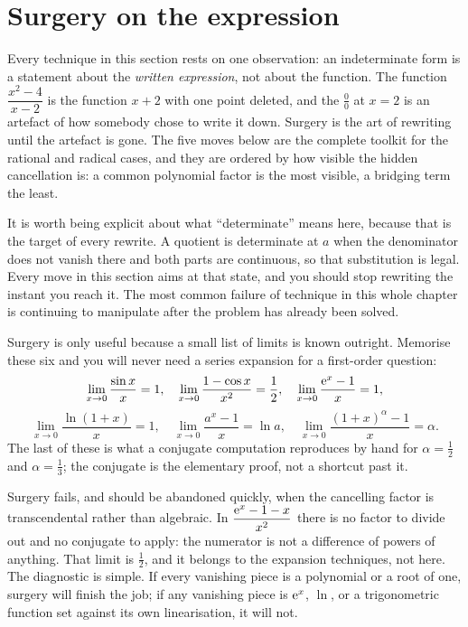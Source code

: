 \section{Surgery on the expression}

Every technique in this section rests on one observation: an indeterminate form is a statement about the \emph{written expression}, not about the function. The function $\dfrac{x^{2}-4}{x-2}$ is the function $x+2$ with one point deleted, and the $\tfrac00$ at $x=2$ is an artefact of how somebody chose to write it down. Surgery is the art of rewriting until the artefact is gone. The five moves below are the complete toolkit for the rational and radical cases, and they are ordered by how visible the hidden cancellation is: a common polynomial factor is the most visible, a bridging term the least.

It is worth being explicit about what ``determinate'' means here, because that is the target of every rewrite. A quotient is determinate at $a$ when the denominator does not vanish there and both parts are continuous, so that substitution is legal. Every move in this section aims at that state, and you should stop rewriting the instant you reach it. The most common failure of technique in this whole chapter is continuing to manipulate after the problem has already been solved.

\begin{keynote}
Surgery is only useful because a small list of limits is known outright. Memorise these six and you will never need a series expansion for a first-order question:
\[\lim_{x\to0}\frac{\sin x}{x}=1,\quad \lim_{x\to0}\frac{1-\cos x}{x^{2}}=\frac12,\quad \lim_{x\to0}\frac{\mathrm{e}^{x}-1}{x}=1,\]
\[\lim_{x\to0}\frac{\ln(1+x)}{x}=1,\quad \lim_{x\to0}\frac{a^{x}-1}{x}=\ln a,\quad \lim_{x\to0}\frac{(1+x)^{\alpha}-1}{x}=\alpha .\]
The last of these is what a conjugate computation reproduces by hand for $\alpha=\tfrac12$ and $\alpha=\tfrac13$; the conjugate is the elementary proof, not a shortcut past it.
\end{keynote}

\begin{keynote}
Surgery fails, and should be abandoned quickly, when the cancelling factor is transcendental rather than algebraic. In $\dfrac{\mathrm{e}^{x}-1-x}{x^{2}}$ there is no factor to divide out and no conjugate to apply: the numerator is not a difference of powers of anything. That limit is $\tfrac12$, and it belongs to the expansion techniques, not here. The diagnostic is simple. If every vanishing piece is a polynomial or a root of one, surgery will finish the job; if any vanishing piece is $\mathrm{e}^{x}$, $\ln$, or a trigonometric function set against its own linearisation, it will not.
\end{keynote}

